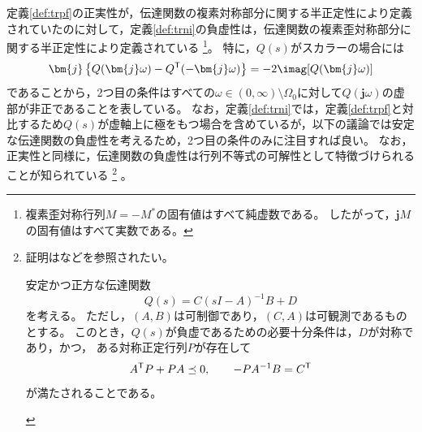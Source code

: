 \documentclass[tombow,dvipdfmx]{corona-a5-1.1}
\begin{document}
定義\ref{def:trpf}の正実性が，伝達関数の複素対称部分に関する半正定性により定義されていたのに対して，定義\ref{def:trni}の負虚性は，伝達関数の複素歪対称部分に関する半正定性により定義されている
\footnote{
複素歪対称行列$M=-M^*$の固有値はすべて純虚数である。
したがって，$\bm{j}M$の固有値はすべて実数である。
}。
特に，$Q(s)$がスカラーの場合には
\begin{align*}
\bm{j}\left\{Q(\bm{j} \omega) - Q^{\sf T}(-\bm{j} \omega) \right\}
= -2 \imag[Q(\bm{j} \omega)]
\end{align*}
であることから，2つ目の条件はすべての$\omega \in (0,\infty)\setminus \Omega_0$に対して$Q(\bm{j}\omega)$の虚部が非正であることを表している。
なお，定義\ref{def:trni}では，定義\ref{def:trpf}と対比するため$Q(s)$が虚軸上に極をもつ場合を含めているが，以下の議論では安定な伝達関数の負虚性を考えるため，2つ目の条件のみに注目すれば良い。
なお，正実性と同様に，伝達関数の負虚性は行列不等式の可解性として特徴づけられることが知られている
\footnote{
証明は\cite[Lemma 7]{xiong2010negative}などを参照されたい。
\begin{補題*}
安定かつ正方な伝達関数
\[
Q(s)=C(sI-A)^{-1}B + D
\]
を考える。
ただし，$(A,B)$は可制御であり，$(C,A)$は可観測であるものとする。
このとき，$Q(s)$が負虚であるための必要十分条件は，$D$が対称であり，かつ，
ある対称正定行列$P$が存在して
\begin{align*}
A^{\sf T}P+PA \preceq 0
,\qquad
-PA^{-1}B = C^{\sf T}
\end{align*}
が満たされることである。
\end{補題*}
}
。
\end{document}
